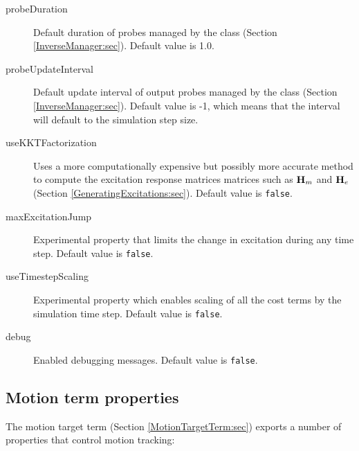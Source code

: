 \begin{description}
\item[probeDuration]\mbox{}

Default duration of probes managed by the 
 class (Section \ref{InverseManager:sec}).
Default value is 1.0.

\item[probeUpdateInterval]\mbox{}

Default update interval of output probes managed by the
 class (Section \ref{InverseManager:sec}).
Default value is -1, which means that the interval will
default to the simulation step size.

\item[useKKTFactorization]\mbox{}

Uses a more computationally expensive but possibly more accurate method to
compute the excitation response matrices matrices such as ${\bf H}_m$ and ${\bf H}_e$
(Section \ref{GeneratingExcitations:sec}). Default value is {\tt false}.

\item[maxExcitationJump]\mbox{}

Experimental property that limits the change in excitation during any time
step. Default value is {\tt false}.

\item[useTimestepScaling]\mbox{}

Experimental property which enables scaling of all the cost
terms by the simulation time step. Default value is {\tt false}.

\item[debug]\mbox{}

Enabled debugging messages. Default value is {\tt false}.

\end{description}

\subsection{Motion term properties}
\label{MotionTermProperties:sec}

The motion target term (Section \ref{MotionTargetTerm:sec}) exports a number of
properties that control motion tracking:

